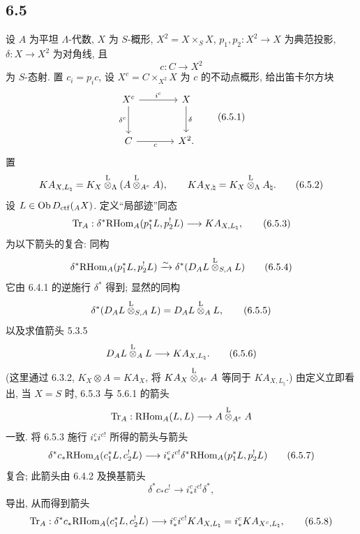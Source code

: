 \subsection*{6.5}
设 $A$ 为平坦 $\Lambda$-代数, $X$ 为 $S$-概形, $X^2=X\times_SX$, $p_1,p_2:X^2\to X$ 为典范投影, $\delta:X\to X^2$ 为对角线, 且
\[
c:C\longrightarrow X^2
\]
为 $S$-态射. 置 $c_i=p_ic$, 设 $X^c=C\times_{X^2}X$ 为 $c$ 的不动点概形, 给出笛卡尔方块
\begin{equation}
\begin{tikzcd}[column sep=large,row sep=large]
X^c \arrow[r,"i^c"] \arrow[d,"\delta^c"'] & X \arrow[d,"\delta"]\\
C \arrow[r,"c"'] & X^2 .
\end{tikzcd}
\tag{6.5.1}
\end{equation}
置
\begin{equation}
KA_{X,L_{\natural}}=K_X\overset{\mathrm L}{\otimes}_{\Lambda}(A\overset{\mathrm L}{\otimes}_{A^e}A),
\qquad
KA_{X,\natural}=K_X\overset{\mathrm L}{\otimes}_{\Lambda}A_{\natural}.
\tag{6.5.2}
\end{equation}
设 $L\in\operatorname{Ob} D_{\mathrm{ctf}}({}_AX)$. 定义``局部迹''同态
\begin{equation}
\operatorname{Tr}_A:\delta^*\mathrm{RHom}_A(p_1^*L,p_2^!L)
\longrightarrow
KA_{X,L_{\natural}},
\tag{6.5.3}
\end{equation}
为以下箭头的复合: 同构
\begin{equation}
\delta^*\mathrm{RHom}_A(p_1^*L,p_2^!L)
\xrightarrow{\sim}
\delta^*(D_AL\overset{\mathrm L}{\otimes}_{S,A}L)
\tag{6.5.4}
\end{equation}
它由 6.4.1 的逆施行 $\delta^*$ 得到; 显然的同构
\begin{equation}
\delta^*(D_AL\overset{\mathrm L}{\otimes}_{S,A}L)=D_AL\overset{\mathrm L}{\otimes}_AL,
\tag{6.5.5}
\end{equation}
以及求值箭头 5.3.5
\begin{equation}
D_AL\overset{\mathrm L}{\otimes}_AL\longrightarrow KA_{X,L_{\natural}}.
\tag{6.5.6}
\end{equation}
(这里通过 6.3.2, $K_X\otimes A=KA_X$, 将 $KA_X\overset{\mathrm L}{\otimes}_{A^e}A$ 等同于 $KA_{X,L_{\natural}}$.)
由定义立即看出, 当 $X=S$ 时, 6.5.3 与 5.6.1 的箭头
\[
\operatorname{Tr}_A:\mathrm{RHom}_A(L,L)\longrightarrow A\overset{\mathrm L}{\otimes}_{A^e}A
\]
一致. 将 6.5.3 施行 $i_*^ci^{c!}$ 所得的箭头与箭头
\begin{equation}
\delta^*c_*\mathrm{RHom}_A(c_1^*L,c_2^!L)
\longrightarrow
i_*^ci^{c!}\delta^*\mathrm{RHom}_A(p_1^*L,p_2^!L)
\tag{6.5.7}
\end{equation}
复合; 此箭头由 6.4.2 及换基箭头
\[
\delta^*c_*c^!\longrightarrow i_*^ci^{c!}\delta^*,
\]
导出, 从而得到箭头
\begin{equation}
\operatorname{Tr}_A:\delta^*c_*\mathrm{RHom}_A(c_1^*L,c_2^!L)
\longrightarrow
i_*^ci^{c!}KA_{X,L_{\natural}}
=i_*^cKA_{X^c,L_{\natural}},
\tag{6.5.8}
\end{equation}
